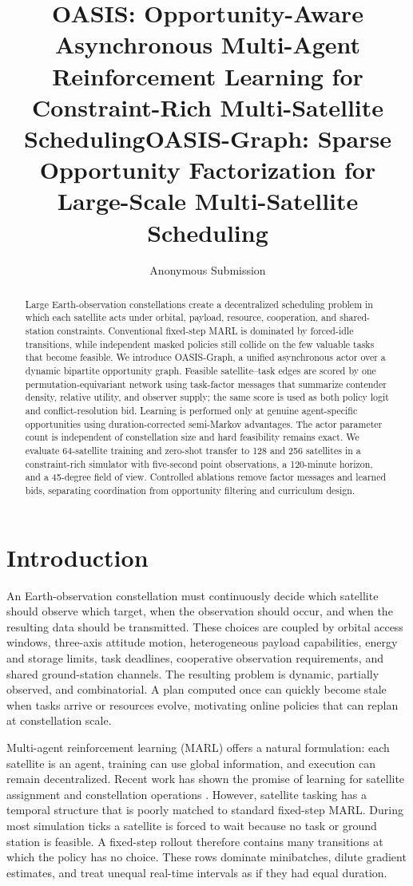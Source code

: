 \documentclass[letterpaper]{article}
\title{OASIS: Opportunity-Aware Asynchronous Multi-Agent Reinforcement Learning for Constraint-Rich Multi-Satellite Scheduling}
\title{OASIS-Graph: Sparse Opportunity Factorization for Large-Scale Multi-Satellite Scheduling}
\author{Anonymous Submission}
\begin{document}
\maketitle

\begin{abstract}
Large Earth-observation constellations create a decentralized scheduling problem in which each satellite acts under orbital, payload, resource, cooperation, and shared-station constraints.  Conventional fixed-step MARL is dominated by forced-idle transitions, while independent masked policies still collide on the few valuable tasks that become feasible.  We introduce OASIS-Graph, a unified asynchronous actor over a dynamic bipartite opportunity graph.  Feasible satellite--task edges are scored by one permutation-equivariant network using task-factor messages that summarize contender density, relative utility, and observer supply; the same score is used as both policy logit and conflict-resolution bid.  Learning is performed only at genuine agent-specific opportunities using duration-corrected semi-Markov advantages.  The actor parameter count is independent of constellation size and hard feasibility remains exact.  We evaluate 64-satellite training and zero-shot transfer to 128 and 256 satellites in a constraint-rich simulator with five-second point observations, a 120-minute horizon, and a 45-degree field of view.  Controlled ablations remove factor messages and learned bids, separating coordination from opportunity filtering and curriculum design.
\end{abstract}

\section{Introduction}

An Earth-observation constellation must continuously decide which satellite should observe which target, when the observation should occur, and when the resulting data should be transmitted.  These choices are coupled by orbital access windows, three-axis attitude motion, heterogeneous payload capabilities, energy and storage limits, task deadlines, cooperative observation requirements, and shared ground-station channels.  The resulting problem is dynamic, partially observed, and combinatorial.  A plan computed once can quickly become stale when tasks arrive or resources evolve, motivating online policies that can replan at constellation scale.

Multi-agent reinforcement learning (MARL) offers a natural formulation: each satellite is an agent, training can use global information, and execution can remain decentralized.  Recent work has shown the promise of learning for satellite assignment and constellation operations \cite{holder2025satellite,herrmann2024single,he2025transformer}.  However, satellite tasking has a temporal structure that is poorly matched to standard fixed-step MARL.  During most simulation ticks a satellite is forced to wait because no task or ground station is feasible.  A fixed-step rollout therefore contains many transitions at which the policy has no choice.  These rows dominate minibatches, dilute gradient estimates, and treat unequal real-time intervals as if they had equal duration.
\end{document}
